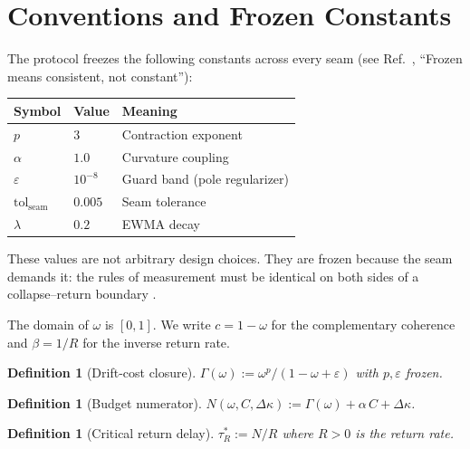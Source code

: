 \documentclass[
  aps,
  prd,
  twocolumn,
  showpacs,
  superscriptaddress,
  nofootinbib,
  floatfix
]{revtex4-2}
\newtheorem{definition}[theorem]{Definition}
\newcommand{\tR}{\tau_{\!R}^{*}}
\newcommand{\Gam}{\Gamma}
\newcommand{\eps}{\varepsilon}
\newcommand{\tolseam}{\mathrm{tol}_{\mathrm{seam}}}
\begin{document}
\section{Conventions and Frozen Constants}\label{sec:conventions}

The protocol freezes the following constants across every seam
(see Ref.~\cite{paulus2025physicscoherence}, ``Frozen means
consistent, not constant''):

\begin{center}
\begin{tabular}{@{}lll@{}}
\toprule
Symbol & Value & Meaning \\
\midrule
$p$ & $3$ & Contraction exponent \\
$\alpha$ & $1.0$ & Curvature coupling \\
$\eps$ & $10^{-8}$ & Guard band (pole regularizer) \\
$\tolseam$ & $0.005$ & Seam tolerance \\
$\lambda$ & $0.2$ & EWMA decay \\
\bottomrule
\end{tabular}
\end{center}

These values are not arbitrary design choices.  They are frozen
because the seam demands it: the rules of measurement must be
identical on both sides of a collapse--return boundary
\cite{paulus2025physicscoherence}.

The domain of $\omega$ is $[0,1]$.
We write $c=1-\omega$ for the complementary coherence and
$\beta=1/R$ for the inverse return rate.

\begin{definition}[Drift-cost closure]\label{def:gamma}
$\Gam(\omega) := \omega^{p}/(1-\omega+\eps)$ with $p,\eps$ frozen.
\end{definition}

\begin{definition}[Budget numerator]\label{def:N}
$N(\omega,C,\Delta\kappa) := \Gam(\omega) + \alpha\,C + \Delta\kappa$.
\end{definition}

\begin{definition}[Critical return delay]\label{def:tRstar}
$\tR := N/R$ where $R>0$ is the return rate.
\end{definition}

\end{document}
